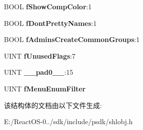 \begin{DoxyCompactItemize}
\item 
\mbox{\label{struct_c_a_b_i_n_e_t_s_t_a_t_e_a2cf7bdcced99c6336d0c56c63586ef37}} 
B\+O\+OL {\bfseries f\+Show\+Comp\+Color}\+:1
\item 
\mbox{\label{struct_c_a_b_i_n_e_t_s_t_a_t_e_a1942eec0cd39b04dfb5bb2c61419da86}} 
B\+O\+OL {\bfseries f\+Dont\+Pretty\+Names}\+:1
\item 
\mbox{\label{struct_c_a_b_i_n_e_t_s_t_a_t_e_a858a0837d1352920b7d6ef5f0f08021f}} 
B\+O\+OL {\bfseries f\+Admins\+Create\+Common\+Groups}\+:1
\item 
\mbox{\label{struct_c_a_b_i_n_e_t_s_t_a_t_e_a7fa64e3139a8fec9ebcbc37f37eff421}} 
U\+I\+NT {\bfseries f\+Unused\+Flags}\+:7
\item 
\mbox{\label{struct_c_a_b_i_n_e_t_s_t_a_t_e_aec3203bfd24304f72a4217ee185c75b3}} 
U\+I\+NT {\bfseries \+\_\+\+\_\+pad0\+\_\+\+\_\+}\+:15
\item 
\mbox{\label{struct_c_a_b_i_n_e_t_s_t_a_t_e_a0946dded080773d8d5289af214699e76}} 
U\+I\+NT {\bfseries f\+Menu\+Enum\+Filter}
\end{DoxyCompactItemize}


该结构体的文档由以下文件生成\+:\begin{DoxyCompactItemize}
\item 
E\+:/\+React\+O\+S-\/0../sdk/include/psdk/shlobj.\+h\end{DoxyCompactItemize}
